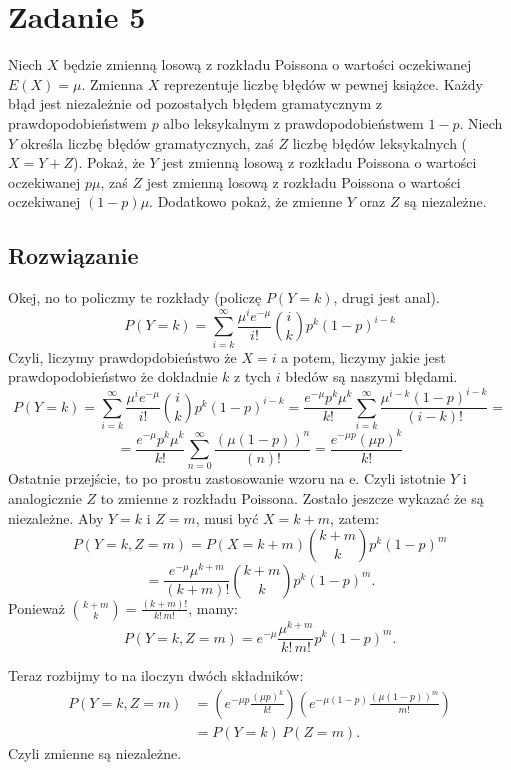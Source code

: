\section{Zadanie 5}
Niech \(X\) będzie zmienną losową z rozkładu Poissona o wartości oczekiwanej
\(E(X) = \mu\). Zmienna \(X\) reprezentuje liczbę błędów w pewnej książce. Każdy błąd jest
niezależnie od pozostałych błędem gramatycznym z prawdopodobieństwem \(p\) albo leksykalnym z prawdopodobieństwem \(1-p\). Niech \(Y\) określa liczbę błędów gramatycznych, zaś
\(Z\) liczbę błędów leksykalnych (\(X = Y + Z\)). Pokaż, że \(Y\) jest zmienną losową z rozkładu
Poissona o wartości oczekiwanej \(p \mu\), zaś \(Z\) jest zmienną losową z rozkładu Poissona o
wartości oczekiwanej \((1 - p) \mu\). Dodatkowo pokaż, że zmienne \(Y\) oraz \(Z\) są niezależne.

\subsection*{Rozwiązanie}
Okej, no to policzmy te rozkłady (policzę \(P(Y=k)\), drugi jest anal).
\[P(Y =k) = \sum_{i=k}^\infty \frac{\mu^i e^{-\mu}}{i!}\binom{i}{k}p^k(1-p)^{i-k}\]
Czyli, liczymy prawdopdobieństwo że \(X = i\) a potem, liczymy jakie jest prawdopodobieństwo że dokładnie \(k\) z tych \(i\) błedów są naszymi błędami.
\[P(Y =k) =\sum_{i=k}^\infty \frac{\mu^i e^{-\mu}}{i!}\binom{i}{k}p^k(1-p)^{i-k} = \frac{e^{-\mu}p^k\mu^k}{k!} \sum_{i=k}^\infty\frac{\mu^{i-k}(1-p)^{i-k}}{(i-k)!} = \]
\[=\frac{e^{-\mu}p^k\mu^k}{k!}  \sum_{n=0}^\infty\frac{(\mu(1-p))^{n}}{(n)!} = \frac{e^{-\mu p} (\mu p)^k}{k!}\]
Ostatnie przejście, to po prostu zastosowanie wzoru na e. Czyli istotnie \(Y\) i analogicznie \(Z\) to zmienne z rozkładu Poissona. Zostało jeszcze wykazać że są niezależne. Aby \(Y = k\) i \(Z = m\), musi być \(X = k + m\), zatem:
\[
	P(Y = k, Z = m)
	= P(X = k+m) \binom{k+m}{k} p^k (1-p)^m \]\[
	= \frac{e^{-\mu} \mu^{k+m}}{(k+m)!} \binom{k+m}{k} p^k (1-p)^m.
\]
Ponieważ \(\binom{k+m}{k} = \frac{(k+m)!}{k!\,m!}\), mamy:
\[
	P(Y = k, Z = m) = e^{-\mu} \frac{\mu^{k+m}}{k!\,m!} p^k (1-p)^m.
\]

Teraz rozbijmy to na iloczyn dwóch składników:
\[
	\begin{aligned}
		P(Y = k, Z = m)
		 & = \left( e^{-\mu p} \frac{(\mu p)^k}{k!} \right)
		\left( e^{-\mu (1-p)} \frac{(\mu (1-p))^m}{m!} \right) \\
		 & = P(Y = k) \, P(Z = m).
	\end{aligned}
\]
Czyli zmienne są niezależne.
